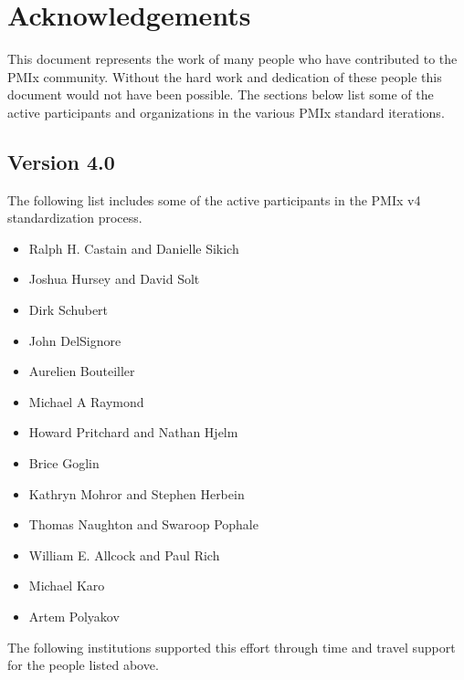 \chapter{Acknowledgements}
\label{chap:acknowledgements}

This document represents the work of many people who have contributed to the PMIx community.
Without the hard work and dedication of these people this document would not have been possible.
The sections below list some of the active participants and organizations in the various PMIx standard iterations.

\section{Version 4.0}

The following list includes some of the active participants in the PMIx v4 standardization process.

\begin{itemize}
\item Ralph H. Castain and Danielle Sikich
\item Joshua Hursey and David Solt
\item Dirk Schubert
\item John DelSignore
\item Aurelien Bouteiller
\item Michael A Raymond
\item Howard Pritchard and Nathan Hjelm
\item Brice Goglin
\item Kathryn Mohror and Stephen Herbein
\item Thomas Naughton and Swaroop Pophale
\item William E. Allcock and Paul Rich
\item Michael Karo
\item Artem Polyakov
\end{itemize}

The following institutions supported this effort through time and travel support for the people listed above.


